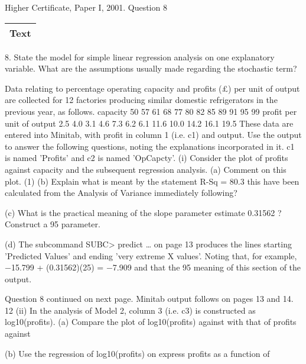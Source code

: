 \documentclass[a4paper,12pt]{article}
\begin{document}
Higher Certificate, Paper I, 2001. Question 8
\begin{table}[ht!]
     \centering
     \begin{tabular}{|p{15cm}|}
     \hline        
\noindent Text
\\ \hline
      \end{tabular}
    \end{table}


8. State the model for simple linear regression analysis on one explanatory variable.
What are the assumptions usually made regarding the stochastic term?

Data relating to percentage operating capacity and profits (£) per unit of output are
collected for 12 factories producing similar domestic refrigerators in the previous
year, as follows.
capacity
50 57 61 68 77 80 82 85 89 91 95 99
profit per unit
of output
2.5 4.0 3.1 4.6 7.3 6.2 6.1 11.6 10.0 14.2 16.1 19.5
These data are entered into Minitab, with profit in column 1 (i.e. c1) and
output. Use the output to answer the following questions, noting the explanations
incorporated in it. c1 is named 'Profits' and c2 is named 'OpCapcty'.
(i) Consider the plot of profits against capacity and the subsequent regression
analysis.
(a) Comment on this plot.
(1)
(b) Explain what is meant by the statement R-Sq = 80.3%
this have been calculated from the Analysis of Variance
immediately following?

(c) What is the practical meaning of the slope parameter estimate
0.31562 ? Construct a 95%
parameter.

(d) The subcommand SUBC> predict … on page 13 produces the
lines starting 'Predicted Values' and ending 'very extreme X values'.
Noting that, for example, −15.799 + (0.31562)(25) = −7.909 and
that the 95%
meaning of this section of the output.

Question 8 continued on next page.
Minitab output follows on pages 13 and 14.
12
(ii) In the analysis of Model 2, column 3 (i.e. c3) is constructed as
log10(profits).
(a) Compare the plot of log10(profits) against %
with that of profits against %

(b) Use the regression of log10(profits) on %
express profits as a function of %
\end{document}
